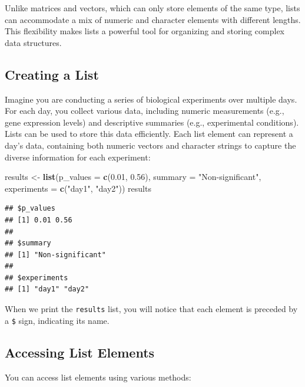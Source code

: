 \documentclass[
]{book}
\newenvironment{Shaded}{\begin{snugshade}}{\end{snugshade}}
\newcommand{\AttributeTok}[1]{\textcolor[rgb]{0.13,0.29,0.53}{#1}}
\newcommand{\FloatTok}[1]{\textcolor[rgb]{0.00,0.00,0.81}{#1}}
\newcommand{\FunctionTok}[1]{\textcolor[rgb]{0.13,0.29,0.53}{\textbf{#1}}}
\newcommand{\NormalTok}[1]{#1}
\newcommand{\OtherTok}[1]{\textcolor[rgb]{0.56,0.35,0.01}{#1}}
\newcommand{\StringTok}[1]{\textcolor[rgb]{0.31,0.60,0.02}{#1}}
\begin{document}
Unlike matrices and vectors, which can only store elements of the same type, lists can accommodate a mix of numeric and character elements with different lengths. This flexibility makes lists a powerful tool for organizing and storing complex data structures.

\hypertarget{creating-a-list}{%
\subsection{Creating a List}\label{creating-a-list}}

Imagine you are conducting a series of biological experiments over multiple days. For each day, you collect various data, including numeric measurements (e.g., gene expression levels) and descriptive summaries (e.g., experimental conditions). Lists can be used to store this data efficiently. Each list element can represent a day's data, containing both numeric vectors and character strings to capture the diverse information for each experiment:

\begin{Shaded}
\begin{Highlighting}[]
\NormalTok{results }\OtherTok{\textless{}{-}} \FunctionTok{list}\NormalTok{(}\AttributeTok{p\_values =} \FunctionTok{c}\NormalTok{(}\FloatTok{0.01}\NormalTok{, }\FloatTok{0.56}\NormalTok{),}
                \AttributeTok{summary =} \StringTok{"Non{-}significant"}\NormalTok{,}
                \AttributeTok{experiments =} \FunctionTok{c}\NormalTok{(}\StringTok{"day1"}\NormalTok{, }\StringTok{"day2"}\NormalTok{))}
\NormalTok{results}
\end{Highlighting}
\end{Shaded}

\begin{verbatim}
## $p_values
## [1] 0.01 0.56
## 
## $summary
## [1] "Non-significant"
## 
## $experiments
## [1] "day1" "day2"
\end{verbatim}

When we print the \texttt{results} list, you will notice that each element is preceded by a \texttt{\$} sign, indicating its name.

\hypertarget{accessing-list-elements}{%
\subsection{Accessing List Elements}\label{accessing-list-elements}}

You can access list elements using various methods:
\end{document}
